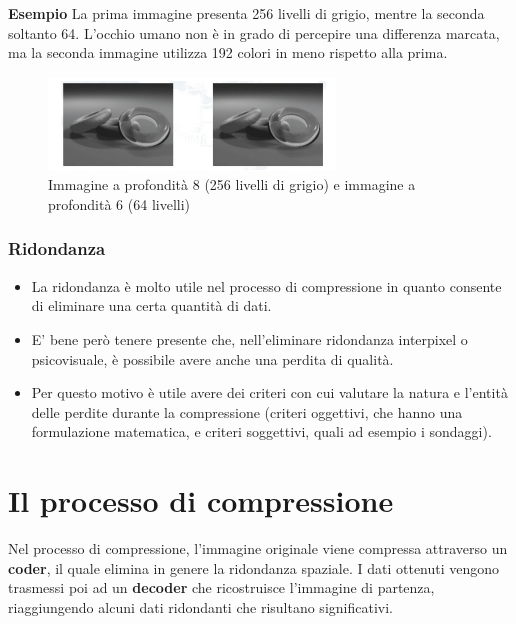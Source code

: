 \textbf{Esempio}
La prima immagine presenta 256 livelli di grigio, mentre la seconda soltanto 64.
L'occhio umano non è in grado di percepire una differenza marcata, ma la seconda immagine utilizza
192 colori in meno rispetto alla prima.

\begin{figure}[H]
    \centering
    \includegraphics[width=\linewidth, keepaspectratio]{capitoli/immagini/imgs/ridondanza-psicovisuale.png}
    \caption{Immagine a profondità 8 (256 livelli di grigio) e immagine a
        profondità 6 (64 livelli)}
\end{figure}

\subsubsection{Ridondanza}
\begin{itemize}
    \item La ridondanza è molto utile nel processo di compressione in
          quanto consente di eliminare una certa quantità di dati.
    \item E' bene però tenere presente che, nell'eliminare ridondanza
          interpixel o psicovisuale, è possibile avere anche una perdita di
          qualità.
    \item Per questo motivo è utile avere dei criteri con cui valutare la
          natura e l'entità delle perdite durante la compressione (criteri
          oggettivi, che hanno una formulazione matematica, e criteri soggettivi, quali ad esempio i sondaggi).
\end{itemize}

\section{Il processo di compressione}
Nel processo di compressione, l'immagine originale viene compressa
attraverso un \textbf{coder}, il quale elimina in genere la ridondanza spaziale.
I dati ottenuti vengono trasmessi poi ad un \textbf{decoder} che
ricostruisce l'immagine di partenza, riaggiungendo alcuni dati ridondanti che risultano significativi.

